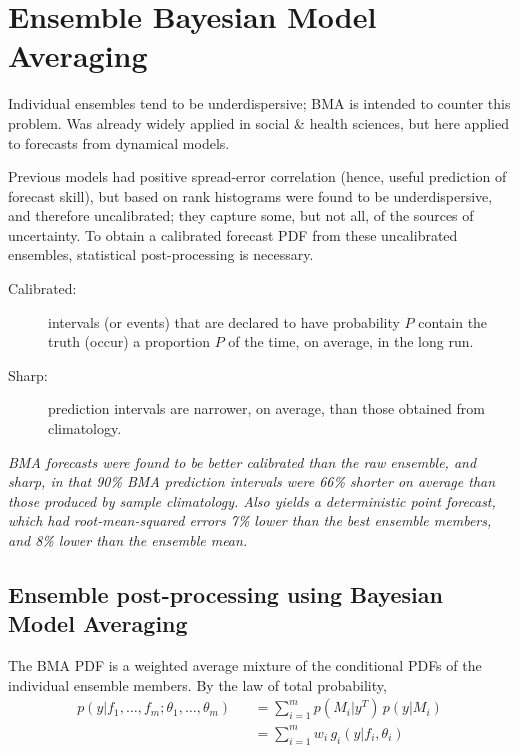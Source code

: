 \documentclass[10pt,fleqn]{article}
\begin{document}
\section{Ensemble Bayesian Model Averaging \cite{Raftery2005}}

Individual ensembles tend to be underdispersive; BMA is intended to counter this problem. Was already widely applied in social \& health sciences, but here applied to forecasts from dynamical models.

Previous models had positive spread-error correlation (hence, useful prediction of forecast skill), but based on rank histograms were found to be underdispersive, and therefore uncalibrated; they capture some, but not all, of the sources of uncertainty. To obtain a calibrated forecast PDF from these uncalibrated ensembles, statistical post-processing is necessary. 

\begin{description}
\item[Calibrated:] intervals (or events) that are declared to have probability $P$ contain the truth (occur) a proportion $P$ of the time, on average, in the long run.

\item[Sharp:] prediction intervals are narrower, on average, than those obtained from climatology. 
\end{description}

\textit{\small{BMA forecasts were found to be better calibrated than the raw ensemble, and sharp, in that 90\% BMA prediction intervals were 66\% shorter on average than those produced by sample climatology. Also yields a deterministic point forecast, which had root-mean-squared errors 7\% lower than the best ensemble members, and 8\% lower than the ensemble mean.}}

\subsection{Ensemble post-processing using Bayesian Model Averaging}

The BMA PDF is a weighted average mixture of the conditional PDFs of the individual ensemble members. By the law of total probability, 
%
\begin{eqnarray*}
p(y|f_1, \dots, f_m; \theta_1, \dots, \theta_m) && = \sum_{i=1}^m p(M_i|y^T) \, p(y | M_i)  \\
&&= \sum_{i=1}^m w_i \, g_i(y|f_i, \theta_i)
\end{eqnarray*} 
%
\end{document}
